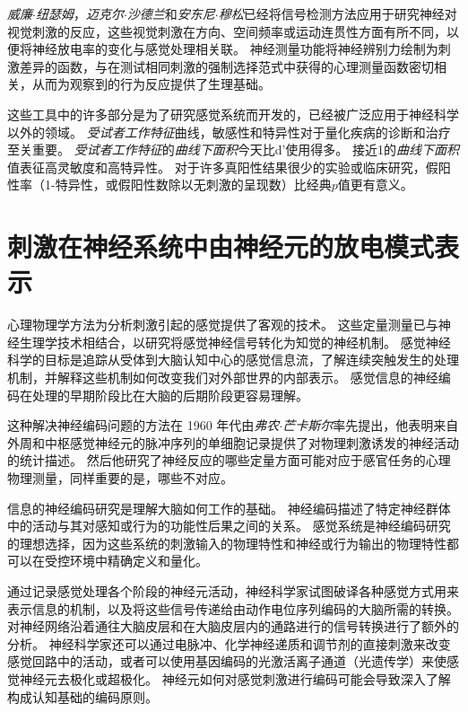 \begin{proposition}
	\quad \quad \textit{威廉$\cdot$纽瑟姆}，\textit{迈克尔$\cdot$沙德兰}和\textit{安东尼$\cdot$穆松}已经将信号检测方法应用于研究神经对视觉刺激的反应，这些视觉刺激在方向、空间频率或运动连贯性方面有所不同，以便将神经放电率的变化与感觉处理相关联。
	神经测量功能将神经辨别力绘制为刺激差异的函数，与在测试相同刺激的强制选择范式中获得的心理测量函数密切相关，从而为观察到的行为反应提供了生理基础。
	
	\quad \quad 这些工具中的许多部分是为了研究感觉系统而开发的，已经被广泛应用于神经科学以外的领域。
	\textit{受试者工作特征}曲线，敏感性和特异性对于量化疾病的诊断和治疗至关重要。
	\textit{受试者工作特征}的\textit{曲线下面积}今天比d'使用得多。
	接近1的\textit{曲线下面积}值表征高灵敏度和高特异性。
	对于许多真阳性结果很少的实验或临床研究，假阳性率（1-特异性，或假阳性数除以无刺激的呈现数）比经典$ p $值更有意义。
	
\end{proposition}



\section{刺激在神经系统中由神经元的放电模式表示}
心理物理学方法为分析刺激引起的感觉提供了客观的技术。 
这些定量测量已与神经生理学技术相结合，以研究将感觉神经信号转化为知觉的神经机制。 
感觉神经科学的目标是追踪从受体到大脑认知中心的感觉信息流，了解连续突触发生的处理机制，并解释这些机制如何改变我们对外部世界的内部表示。
感觉信息的神经编码在处理的早期阶段比在大脑的后期阶段更容易理解。


这种解决神经编码问题的方法在 1960 年代由\textit{弗农$\cdot$芒卡斯尔}率先提出，他表明来自外周和中枢感觉神经元的脉冲序列的单细胞记录提供了对物理刺激诱发的神经活动的统计描述。
然后他研究了神经反应的哪些定量方面可能对应于感官任务的心理物理测量，同样重要的是，哪些不对应。


信息的神经编码研究是理解大脑如何工作的基础。
神经编码描述了特定神经群体中的活动与其对感知或行为的功能性后果之间的关系。
感觉系统是神经编码研究的理想选择，因为这些系统的刺激输入的物理特性和神经或行为输出的物理特性都可以在受控环境中精确定义和量化。


通过记录感觉处理各个阶段的神经元活动，神经科学家试图破译各种感觉方式用来表示信息的机制，以及将这些信号传递给由动作电位序列编码的大脑所需的转换。 
对神经网络沿着通往大脑皮层和在大脑皮层内的通路进行的信号转换进行了额外的分析。 
神经科学家还可以通过电脉冲、化学神经递质和调节剂的直接刺激来改变感觉回路中的活动，或者可以使用基因编码的光激活离子通道（光遗传学）来使感觉神经元去极化或超极化。 
神经元如何对感觉刺激进行编码可能会导致深入了解构成认知基础的编码原则。


